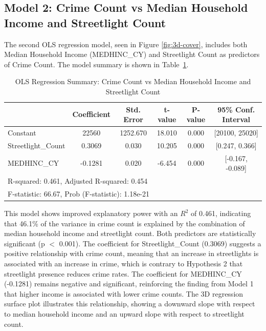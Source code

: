 \documentclass{report}
\begin{document}
\newpage
\subsection{Model 2: Crime Count vs Median Household Income and Streetlight Count}
The second OLS regression model, seen in Figure \ref{fig:3d-cover}, includes both Median Household Income (MEDHINC\_CY) and Streetlight Count as predictors of Crime Count. The model summary is shown in Table~\ref{tab:model2_summary}.


\begin{table}[h!]
\centering
\caption{OLS Regression Summary: Crime Count vs Median Household Income and Streetlight Count}
\label{tab:model2_summary}
\begin{tabular}{lccccc}
\toprule
 & Coefficient & Std. Error & t-value & P-value & 95\% Conf. Interval \\
\midrule
Constant & 22560 & 1252.670 & 18.010 & 0.000 & [20100, 25020] \\
Streetlight\_Count & 0.3069 & 0.030 & 10.205 & 0.000 & [0.247, 0.366] \\
MEDHINC\_CY & -0.1281 & 0.020 & -6.454 & 0.000 & [-0.167, -0.089] \\
\midrule
\multicolumn{6}{l}{R-squared: 0.461, Adjusted R-squared: 0.454} \\
\multicolumn{6}{l}{F-statistic: 66.67, Prob (F-statistic): 1.18e-21} \\
\bottomrule
\end{tabular}
\end{table}

\par This model shows improved explanatory power with an $R^2$ of 0.461, indicating that 46.1\% of the variance in crime count is explained by the combination of median household income and streetlight count. Both predictors are statistically significant (p $<$ 0.001). The coefficient for Streetlight\_Count (0.3069) suggests a positive relationship with crime count, meaning that an increase in streetlights is associated with an increase in crime, which is contrary to Hypothesis 2 that streetlight presence reduces crime rates. The coefficient for MEDHINC\_CY (-0.1281) remains negative and significant, reinforcing the finding from Model 1 that higher income is associated with lower crime counts. The 3D regression surface plot illustrates this relationship, showing a downward slope with respect to median household income and an upward slope with respect to streetlight count.
\end{document}
